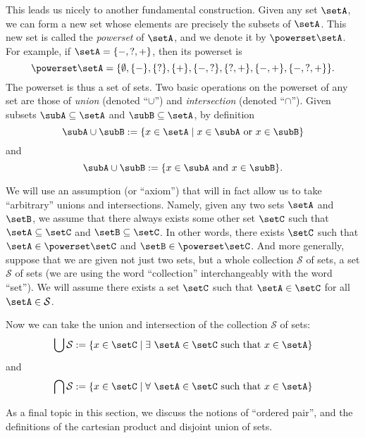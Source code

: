 {This leads us nicely to another fundamental construction. Given any set $\setA$, we can form a new set whose elements are precisely the subsets of $\setA$. This new set is called the \emph{powerset} of $\setA$, and we denote it by $\powerset \setA$. For example, if $\setA = \{ -, ?, + \}$, then its powerset is 
\begin{equation}
\powerset \setA = \{ \emptyset, \{ - \}, \{ ? \}, \{ + \}, \{ -, ? \}, \{ ?, + \}, \{ -, +\}, \{ -, ?, + \} \}. 
\end{equation}
The powerset is thus a set of sets. 
Two basic operations on the powerset of any set are those of \emph{union} (denoted ``$\cup$'') and \emph{intersection} (denoted ``$\cap$''). Given subsets $\subA \subseteq \setA$ and $\subB \subseteq \setA$, by definition
\begin{equation}
\subA \cup \subB := \{ x \in \setA \mid x \in \subA \text{ or } x \in \subB \}
\end{equation}
and
\begin{equation}
\subA \cup \subB := \{ x \in \subA \text{ and } x \in \subB \}.
\end{equation}



We will use an assumption (or ``axiom'') that will in fact allow us to take ``arbitrary'' unions and intersections. 
Namely, given any two sets $\setA$ and $\setB$, we assume that there always exists some other set $\setC$ such that $\setA \subseteq \setC$ and $\setB \subseteq \setC$. In other words, there exists $\setC$ such that $\setA \in \powerset \setC$ and $\setB \in \powerset \setC$. And more generally, suppose that we are given not just two sets, but a whole collection $\mathcal{S}$ of sets,  a set $\mathcal{S}$ of sets (we are using the word ``collection'' interchangeably with the word ``set''). We will assume there exists a set $\setC$ such that $\setA \in \setC$ for all $\setA \in \mathcal{S}$. 

Now we can take the union and intersection of the collection $\mathcal{S}$ of sets:
\begin{equation}
\bigcup \mathcal{S} := \{ x \in \setC \mid \exists \  \setA \in \setC \text{ such that } x \in \setA \}
\end{equation}
and
\begin{equation}
\bigcap \mathcal{S} := \{ x \in \setC \mid \forall \  \setA \in \setC \text{ such that } x \in \setA \}
\end{equation}


As a final topic in this section, we discuss the notions of ``ordered pair'', and the definitions of the cartesian product and disjoint union of sets. 

}
